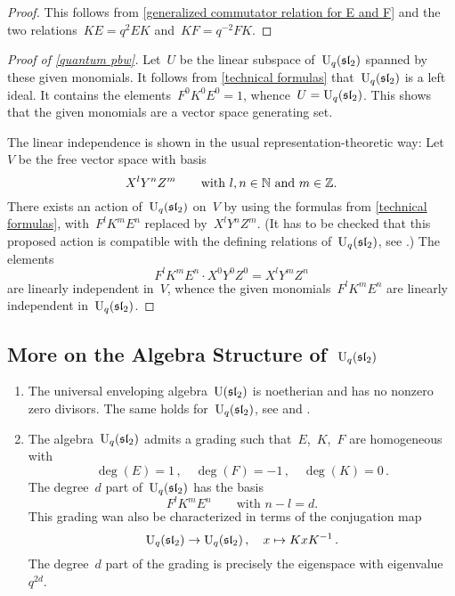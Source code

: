 \documentclass[a4paper, 11pt, oneside]{scrartcl}
\begin{document}
\begin{proof}
  This follows from \cref{generalized commutator relation for E and F} and the two relations~$KE = q^2 EK$ and~$KF = q^{-2} FK$.
\end{proof}

\begin{proof}[Proof of \cref{quantum pbw}]
  Let~$U$ be the linear subspace of~$\operatorname{U}_q(\mathfrak{sl}_2)$ spanned by these given monomials. 
  It follows from \cref{technical formulas} that~$\operatorname{U}_q(\mathfrak{sl}_2)$ is a left ideal.
  It contains the elements~$F^0 K^0 E^0 = 1$, whence~$U = \operatorname{U}_q(\mathfrak{sl}_2)$.
  This shows that the given monomials are a vector space generating set.

  The linear independence is shown in the usual representation-theoretic way:
  Let~$V$ be the free vector space with basis
  \[
    X^l Y^n Z^m
    \qquad
    \text{with~$l, n \in \mathbb{N}$ and~$m \in \mathbb{Z}$}.
  \]
  There exists an action of~$\operatorname{U}_q(\mathfrak{sl}_2)$ on~$V$ by using the formulas from \cref{technical formulas}, with~$F^l K^m E^n$ replaced by~$X^l Y^n Z^m$.
  (It has to be checked that this proposed action is compatible with the defining relations of~$\operatorname{U}_q(\mathfrak{sl}_2)$, see \cite[Appendix 1.5]{jantzen_quantum}.)
  The elements
  \[
    F^l K^m E^n \cdot X^0 Y^0 Z^0
    =
    X^l Y^m Z^n
  \]
  are linearly independent in~$V$, whence the given monomials~$F^l K^m E^n$ are linearly independent in~$\operatorname{U}_q(\mathfrak{sl}_2)$.
\end{proof}



\subsection{More on the Algebra Structure of~$\operatorname{U}_q(\mathfrak{sl}_2)$}

\label{algebra structure of quantum sl2}
\begin{remark}
  \leavevmode
  \begin{enumerate}
    \item
      The universal enveloping algebra~$\operatorname{U}(\mathfrak{sl}_2)$ is noetherian and has no nonzero zero divisors.
      The same holds for~$\operatorname{U}_q(\mathfrak{sl}_2)$, see \cite[Proposition~VI.1.4]{kassel_quantum} and \cite[Propositon~1.8]{jantzen_quantum}.
    \item
      The algebra~$\operatorname{U}_q(\mathfrak{sl}_2)$ admits a grading such that~$E$,~$K$,~$F$ are homogeneous with
      \[
        \deg(E) = 1 \,,
        \quad
        \deg(F) = -1 \,,
        \quad
        \deg(K) = 0 \,.
      \]
      The degree~$d$ part of~$\operatorname{U}_q(\mathfrak{sl}_2)$ has the basis
      \[
        F^l K^m E^n
        \qquad
        \text{with~$n - l = d$.}
      \]
      This grading wan also be characterized in terms of the conjugation map
      \[
        \operatorname{U}_q(\mathfrak{sl}_2)
        \to
        \operatorname{U}_q(\mathfrak{sl}_2) \,,
        \quad
        x
        \mapsto
        K x K^{-1} \,.
      \]
      The degree~$d$ part of the grading is precisely the eigenspace with eigenvalue~$q^{2d}$.
  \end{enumerate}
\end{remark}
\end{document}
